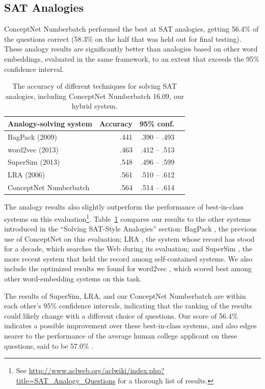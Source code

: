 \documentclass[letterpaper]{article}
\begin{document}
\subsection{SAT Analogies}

ConceptNet Numberbatch performed the best at SAT analogies, getting 56.4\%
of the questions correct (58.3\% on the half that was held out for final
testing). These analogy results are significantly better than analogies based
on other word embeddings, evaluated in the same framework, to an extent that
exceeds the 95\% confidence interval.

\begin{table}[t]
\centering
\begin{tabular}{lrrr}
\bf Analogy-solving system   & \bf Accuracy & \bf 95\% conf. \\
\hline
    BagPack (2009)           & .441 & .390 -- .493 \\
    word2vec (2013)          & .463 & .412 -- .513 \\
    SuperSim (2013)          & .548 & .496 -- .599 \\
    LRA (2006)               & .561 & .510 -- .612 \\
    ConceptNet Numberbatch   & .564 & .514 -- .614
\end{tabular}
    \caption{The accuracy of different techniques for solving SAT analogies,
    including ConceptNet Numberbatch 16.09, our hybrid system.}
\label{analogy-eval-table}
\end{table}

The analogy results also slightly outperform the performance of best-in-class
systems on this evaluation\footnote{See \url{http://www.aclweb.org/aclwiki/index.php?title=SAT_Analogy_Questions} for a
thorough list of results.}. Table~\ref{analogy-eval-table} compares our results
to the other systems introduced in the ``Solving SAT-Style Analogies'' section:
BagPack \cite{herdagdelen2009bagpack}, the previous use of ConceptNet on this
evaluation; LRA \cite{turney2006lra}, the system whose record has stood for a
decade, which searches the Web during its evaluation; and SuperSim
\cite{turney2013supersim}, the more recent system that held the record among
self-contained systems. We also include the optimized results we found for
word2vec \cite{mikolov2013word2vec}, which scored best among other
word-embedding systems on this task.

The results of SuperSim, LRA, and our ConceptNet Numberbatch are within each
other's 95\% confidence intervals, indicating that the ranking of the results
could likely change with a different choice of questions. Our score of 56.4\%
indicates a possible improvement over these best-in-class systems, and also
edges nearer to the performance of the average human college applicant on these
questions, said to be 57.0\% \cite{turney2006lra}.
\end{document}
